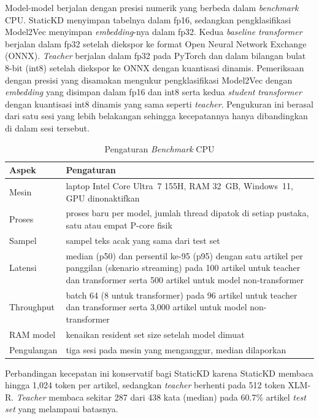 \documentclass{ieeeaccess}
\newcommand{\en}[1]{\textit{#1}}
\begin{document}
Model-model berjalan dengan presisi numerik yang berbeda dalam \en{benchmark} CPU. StaticKD menyimpan tabelnya dalam fp16, sedangkan pengklasifikasi Model2Vec menyimpan \en{embedding}-nya dalam fp32. Kedua \en{baseline} \en{transformer} berjalan dalam fp32 setelah diekspor ke format Open Neural Network Exchange (ONNX). \en{Teacher} berjalan dalam fp32 pada PyTorch dan dalam bilangan bulat 8-bit (int8) setelah diekspor ke ONNX dengan kuantisasi dinamis.
Pemeriksaan dengan presisi yang disamakan mengukur pengklasifikasi Model2Vec dengan \en{embedding} yang disimpan dalam fp16 dan int8 serta kedua \en{student} \en{transformer} dengan kuantisasi int8 dinamis yang sama seperti \en{teacher}. Pengukuran ini berasal dari satu sesi yang lebih belakangan sehingga kecepatannya hanya dibandingkan di dalam sesi tersebut.

\begin{table}[!t]
\caption{Pengaturan \en{Benchmark} CPU}
\label{tab:effsetup}
\centering
\footnotesize
\setlength{\tabcolsep}{3pt}
\begin{tabular}{@{}p{}p{}@{}}
\toprule
Aspek & Pengaturan \\
\midrule
Mesin & laptop Intel Core Ultra~7 155H, RAM 32~GB, Windows~11, GPU dinonaktifkan \\
Proses & proses baru per model, jumlah thread dipatok di setiap pustaka, satu atau empat P-core fisik \\
Sampel & sampel teks acak yang sama dari test set \\
Latensi & median (p50) dan persentil ke-95 (p95) dengan satu artikel per panggilan (skenario streaming) pada 100 artikel untuk teacher dan transformer serta 500 artikel untuk model non-transformer \\
Throughput & batch 64 (8 untuk transformer) pada 96 artikel untuk teacher dan transformer serta 3,000 artikel untuk model non-transformer \\
RAM model & kenaikan resident set size setelah model dimuat \\
Pengulangan & tiga sesi pada mesin yang menganggur, median dilaporkan \\
\bottomrule
\end{tabular}
\end{table}

Perbandingan kecepatan ini konservatif bagi StaticKD karena StaticKD membaca hingga 1,024 token per artikel, sedangkan \en{teacher} berhenti pada 512 token XLM-R. \en{Teacher} membaca sekitar 287 dari 438 kata (median) pada 60.7\% artikel \en{test set} yang melampaui batasnya.
\end{document}
